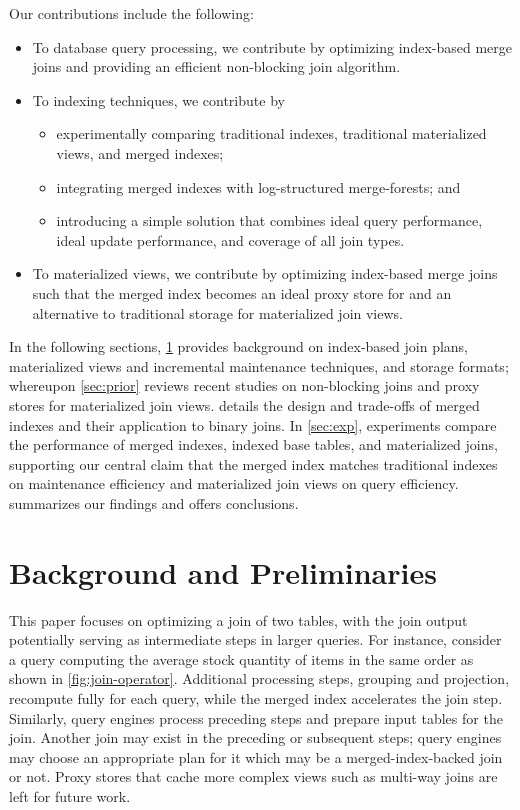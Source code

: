 \documentclass[biblatex, english]{lni}
\begin{document}
Our contributions include the following:
\begin{itemize}
    \item To database query processing, we contribute by optimizing index-based merge joins and providing an efficient non-blocking join algorithm.
    \item To indexing techniques, we contribute by
    \begin{itemize}[noitemsep,topsep=0pt,parsep=0pt]
        \item experimentally comparing traditional indexes, traditional materialized views, and merged indexes;
        \item integrating merged indexes with log-structured merge-forests;
        and
        \item introducing a simple solution that combines ideal query performance, ideal update performance, and coverage of all join types.
    \end{itemize}
    \item To materialized views, we contribute by optimizing index-based merge joins such that the merged index becomes an ideal proxy store for and an alternative to traditional storage for materialized join views.
\end{itemize}

In the following sections, \cref{sec:background} provides background on index-based join plans, materialized views and incremental maintenance techniques, and storage formats; whereupon \cref{sec:prior} reviews recent studies on non-blocking joins and proxy stores for materialized join views.
 details the design and trade-offs of merged indexes and their application to binary joins.
In \cref{sec:exp}, experiments compare the performance of merged indexes, indexed base tables, and materialized joins, supporting our central claim that the merged index matches traditional indexes on maintenance efficiency and materialized join views on query efficiency.
 summarizes our findings and offers conclusions.

\section{Background and Preliminaries}\label{sec:background}

This paper focuses on optimizing a join of two tables, with the join output potentially serving as intermediate steps in larger queries.
For instance, consider a query computing the average stock quantity of items in the same order as shown in \cref{fig:join-operator}.
Additional processing steps, grouping and projection, recompute fully for each query, while the merged index accelerates the join step.
Similarly, query engines process preceding steps and prepare input tables for the join.
Another join may exist in the preceding or subsequent steps; query engines may choose an appropriate plan for it which may be a merged-index-backed join or not.
Proxy stores that cache more complex views such as multi-way joins are left for future work.
\end{document}
